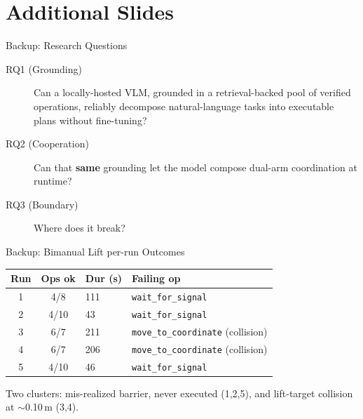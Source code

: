 \documentclass[aspectratio=169,11pt]{beamer}
\begin{document}
\appendix
{}  %

\section*{Additional Slides}

\begin{frame}[noframenumbering]{Backup: Research Questions}
	\small
	\begin{description}
		\item[RQ1 (Grounding)] Can a locally-hosted VLM, grounded in a retrieval-backed pool of verified operations, reliably decompose natural-language tasks into executable plans without fine-tuning?
		\item[RQ2 (Cooperation)] Can that \textbf{same} grounding let the model compose dual-arm coordination at runtime?
		\item[RQ3 (Boundary)] Where does it break?
	\end{description}
\end{frame}

\begin{frame}[noframenumbering]{Backup: Bimanual Lift per-run Outcomes}
	\begin{table}\footnotesize
		\begin{tabular}{ccll}
			\toprule
			\textbf{Run} & \textbf{Ops ok} & \textbf{Dur (s)} & \textbf{Failing op}                       \\
			\midrule
			1            & 4/8             & 111              & \texttt{wait\_for\_signal}                \\
			2            & 4/10            & 43               & \texttt{wait\_for\_signal}                \\
			3            & 6/7             & 211              & \texttt{move\_to\_coordinate} (collision) \\
			4            & 6/7             & 206              & \texttt{move\_to\_coordinate} (collision) \\
			5            & 4/10            & 46               & \texttt{wait\_for\_signal}                \\
			\bottomrule
		\end{tabular}
	\end{table}
	\footnotesize Two clusters: mis-realized barrier, never executed (1,2,5), and lift-target collision at $\sim$0.10\,m (3,4).
\end{frame}
\end{document}

